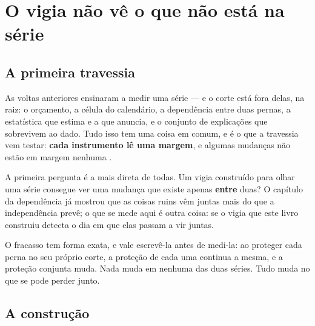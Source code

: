 %
%

\chapter{O vigia não vê o que não está na série}
\label{cap:dependencia_vigiada}

\section{A primeira travessia}

As voltas anteriores ensinaram a medir uma série --- e o corte está fora delas, na raiz: o orçamento, a
célula do calendário, a dependência entre duas pernas, a estatística que estima e a que anuncia, e o
conjunto de explicações que sobrevivem ao dado. Tudo
isso tem uma coisa em comum, e é o que a travessia vem testar: \textbf{cada instrumento lê uma margem},
e algumas mudanças não estão em margem nenhuma \cite{ansari2021sklar}.

A primeira pergunta é a mais direta de todas. Um vigia construído para
olhar uma série consegue ver uma mudança que existe apenas \textbf{entre} duas? O capítulo da
dependência já mostrou que as coisas ruins vêm juntas mais do que a independência prevê; o que se mede aqui é outra coisa: se o vigia que este livro construiu detecta o dia em que elas
passam a vir juntas.

O fracasso tem forma exata, e vale escrevê-la antes de medi-la: ao proteger cada perna no seu
próprio corte, a proteção de cada uma continua a mesma, e a proteção conjunta muda. Nada muda em
nenhuma das duas séries. Tudo muda no que se pode perder junto.

\section{A construção}

